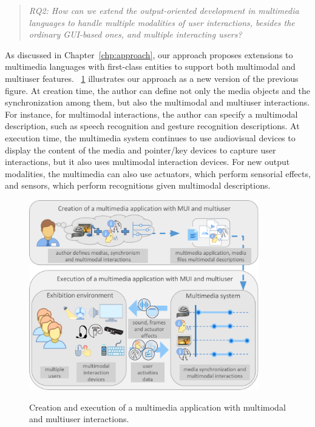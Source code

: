 \documentclass[
  doutorado,
  american
]{ThesisPUC}
\newcommand{\fig}[1]{\figurename~\ref{#1}}
\newcommand{\chp}[1]{Chapter~\ref{#1}}
\newcommand{\captionvspace}{\vspace{-1.3em}}
\begin{document}
\begin{quote}
	\textit{RQ2: How can we extend the output-oriented development in multimedia
	languages to handle multiple modalities of user interactions, besides the
	ordinary GUI-based ones, and multiple interacting users?}
\end{quote}

As discussed in \chp{chp:approach}, our approach proposes extensions to
multimedia languages with first-class entities to support both multimodal and
multiuser features. \fig{fig:overview-multimodal} illustrates our approach as a
new version of the previous figure. At creation time, the author can define not
only the media objects and the synchronization among them, but also the
multimodal and multiuser interactions. For instance, for multimodal
interactions, the author can specify a multimodal description, such as speech
recognition and gesture recognition descriptions. At execution time, the
multimedia system continues to use audiovisual devices to display the content of
the media and pointer/key devices to capture user interactions, but it also uses
multimodal interaction devices. For new output modalities, the multimedia can
also use actuators, which perform sensorial effects, and sensors, which perform
recognitions given multimodal descriptions.

\begin{figure}[!ht]
\begin{center}
	\includegraphics[width=10cm, keepaspectratio]{img/img5.png}
	\caption{Creation and execution of a multimedia application with multimodal
	and multiuser interactions.}
    \captionvspace
	\label{fig:overview-multimodal}
\end{center}
\end{figure}
\end{document}
